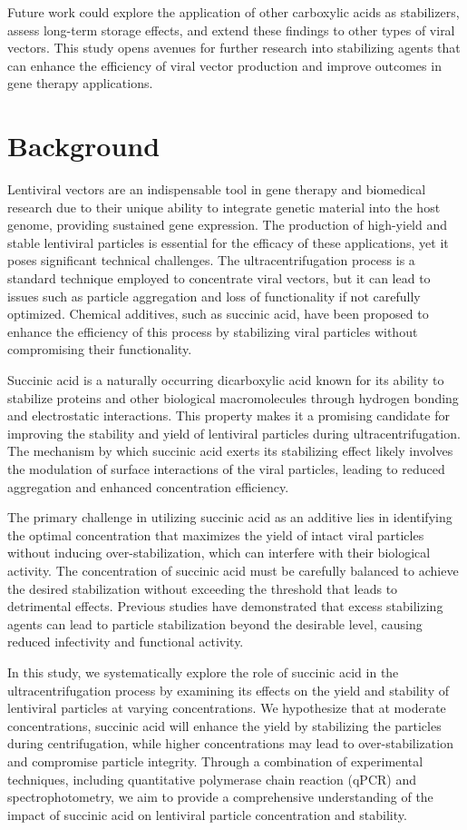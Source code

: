 \documentclass{article}
\begin{document}
Future work could explore the application of other carboxylic acids as stabilizers, assess long-term storage effects, and extend these findings to other types of viral vectors. This study opens avenues for further research into stabilizing agents that can enhance the efficiency of viral vector production and improve outcomes in gene therapy applications.

\section{Background}
Lentiviral vectors are an indispensable tool in gene therapy and biomedical research due to their unique ability to integrate genetic material into the host genome, providing sustained gene expression. The production of high-yield and stable lentiviral particles is essential for the efficacy of these applications, yet it poses significant technical challenges. The ultracentrifugation process is a standard technique employed to concentrate viral vectors, but it can lead to issues such as particle aggregation and loss of functionality if not carefully optimized. Chemical additives, such as succinic acid, have been proposed to enhance the efficiency of this process by stabilizing viral particles without compromising their functionality.

Succinic acid is a naturally occurring dicarboxylic acid known for its ability to stabilize proteins and other biological macromolecules through hydrogen bonding and electrostatic interactions. This property makes it a promising candidate for improving the stability and yield of lentiviral particles during ultracentrifugation. The mechanism by which succinic acid exerts its stabilizing effect likely involves the modulation of surface interactions of the viral particles, leading to reduced aggregation and enhanced concentration efficiency.

The primary challenge in utilizing succinic acid as an additive lies in identifying the optimal concentration that maximizes the yield of intact viral particles without inducing over-stabilization, which can interfere with their biological activity. The concentration of succinic acid must be carefully balanced to achieve the desired stabilization without exceeding the threshold that leads to detrimental effects. Previous studies have demonstrated that excess stabilizing agents can lead to particle stabilization beyond the desirable level, causing reduced infectivity and functional activity.

In this study, we systematically explore the role of succinic acid in the ultracentrifugation process by examining its effects on the yield and stability of lentiviral particles at varying concentrations. We hypothesize that at moderate concentrations, succinic acid will enhance the yield by stabilizing the particles during centrifugation, while higher concentrations may lead to over-stabilization and compromise particle integrity. Through a combination of experimental techniques, including quantitative polymerase chain reaction (qPCR) and spectrophotometry, we aim to provide a comprehensive understanding of the impact of succinic acid on lentiviral particle concentration and stability.
\end{document}
